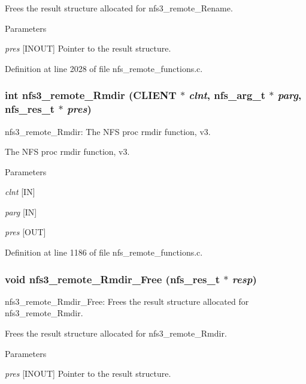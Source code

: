 Frees the result structure allocated for nfs3\_\-remote\_\-Rename.


\begin{DoxyParams}{Parameters}
\item[{\em pres}][INOUT] Pointer to the result structure. \end{DoxyParams}


Definition at line 2028 of file nfs\_\-remote\_\-functions.c.
\subsubsection[{nfs3\_\-remote\_\-Rmdir}]{\setlength{\rightskip}{0pt plus 5cm}int nfs3\_\-remote\_\-Rmdir (CLIENT $\ast$ {\em clnt}, \/  nfs\_\-arg\_\-t $\ast$ {\em parg}, \/  nfs\_\-res\_\-t $\ast$ {\em pres})}\label{group__NFSprocs_ga52a02d259c08d338eed3e708e888106f}
nfs3\_\-remote\_\-Rmdir: The NFS proc rmdir function, v3.

The NFS proc rmdir function, v3.


\begin{DoxyParams}{Parameters}
\item[{\em clnt}][IN] \item[{\em parg}][IN] \item[{\em pres}][OUT] \end{DoxyParams}


Definition at line 1186 of file nfs\_\-remote\_\-functions.c.
\subsubsection[{nfs3\_\-remote\_\-Rmdir\_\-Free}]{\setlength{\rightskip}{0pt plus 5cm}void nfs3\_\-remote\_\-Rmdir\_\-Free (nfs\_\-res\_\-t $\ast$ {\em resp})}\label{group__NFSprocs_gac8b97cb9507986b5220defe6194629d7}
nfs3\_\-remote\_\-Rmdir\_\-Free: Frees the result structure allocated for nfs3\_\-remote\_\-Rmdir.

Frees the result structure allocated for nfs3\_\-remote\_\-Rmdir.


\begin{DoxyParams}{Parameters}
\item[{\em pres}][INOUT] Pointer to the result structure. \end{DoxyParams}


